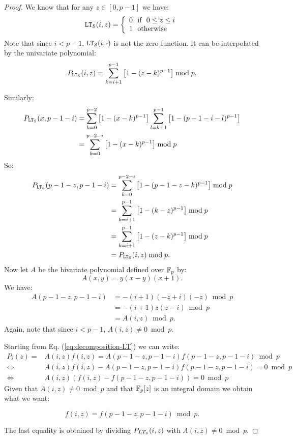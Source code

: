   \begin{proof}
    We know that for any $z\in[0,p-1]$ we have:
    $$\LT_\S(i,z) = \left\{
      \begin{array}{l}
        0 ~\text{ if }~ 0\leq z\leq i \\
        1 ~\text{ otherwise}~
      \end{array}
    \right.$$
    Note that since $i<p-1$, $\LT_\S(i,\cdot)$ is not the zero function. It can be interpolated by the univariate polynomial:
    $$P_{\LT_\S}(i,z) = \displaystyle\sum_{k=i+1}^{p-1}\left[1-(z-k)^{p-1}\right] \bmod p. $$
    
    Similarly:
    \begin{align*}
      P_{\LT_\S}(x,p-1-i) &= \displaystyle\sum_{k=0}^{p-2}\left[1-(x-k)^{p-1}\right]\displaystyle\sum_{l=k+1}^{p-1}\left[1-(p-1-i-l)^{p-1}\right] \\
                          &= \displaystyle\sum_{k=0}^{p-2-i}\left[1-(x-k)^{p-1}\right]  \bmod p
    \end{align*}
    So:
    \begin{align*}
      P_{\LT_\S}(p-1-z,p-1-i) &= \displaystyle\sum_{k=0}^{p-2-i}\left[1-(p-1-z-k)^{p-1}\right]  \bmod p \\
                              &= \displaystyle\sum_{k=i+1}^{p-1}\left[1-(k-z)^{p-1}\right]  \bmod p \\
                              &= \displaystyle\sum_{k=i+1}^{p-1}\left[1-(z-k)^{p-1}\right]  \bmod p \\
                              &=  P_{\LT_\S}(i,z) \bmod p.
    \end{align*}
    Now let $A$ be the bivariate polynomial defined over $\F_p$ by:
    $$A(x,y) = y(x-y)(x+1).$$
    We have:
    \begin{align*}
      A(p-1-z,p-1-i) &= -(i+1)(-z+i)(-z) \bmod p \\
                     &= -(i+1)z(z-i) \bmod p\\
                     &= A(i,z) \bmod p.
    \end{align*}
    Again, note that since $i < p-1$, $A(i,z)\neq 0 \bmod p$.
    
    Starting from Eq. (\ref{eq:decomposition-LT}) we can write:
    \begin{align*}
      P_i(z) =& A(i,z)f(i,z) = A(p-1-z,p-1-i)f(p-1-z,p-1-i) \bmod p \\
      \Leftrightarrow & A(i,z)f(i,z) - A(p-1-z,p-1-i)f(p-1-z,p-1-i) = 0 \bmod p \\
      \Leftrightarrow & A(i,z)(f(i,z) - f(p-1-z,p-1-i)) = 0 \bmod p
    \end{align*}
    Given that $A(i,z)\neq 0 \bmod p$ and that $\F_p[z]$ is an integral domain we obtain what we want:

    $$ f(i,z) = f(p-1-z,p-1-i) \bmod p. $$

    The last equality is obtained by dividing $P_{LT_\S}(i,z)$ with $A(i,z)\neq 0 \bmod p$.
  \end{proof}
